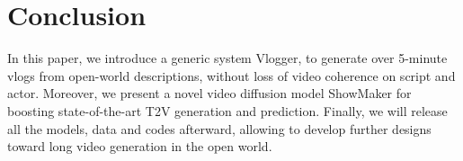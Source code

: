 \section{Conclusion}
\label{sec:conclusion}

In this paper, 
we introduce a generic system Vlogger, to generate over 5-minute vlogs from open-world descriptions, 
without loss of video coherence on script and actor.
Moreover, 
we present a novel video diffusion model ShowMaker for boosting state-of-the-art T2V generation and prediction. 
Finally,
we will release all the models, data and codes afterward,
allowing to develop further designs toward long video generation in the open world.